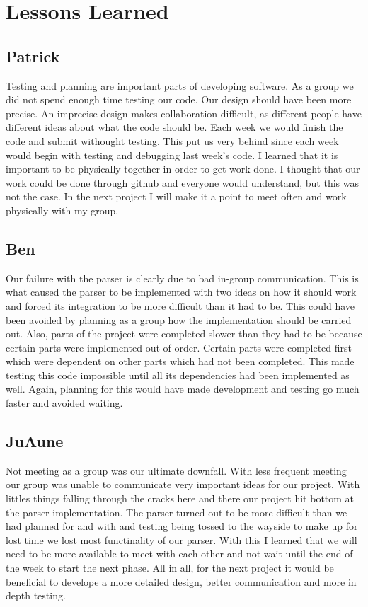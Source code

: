 \documentclass{article}
\begin{document}
\section{Lessons Learned}
\subsection{Patrick} Testing and planning are important parts of developing software. As a group we did not spend enough
time testing our code. Our design should have been more precise. An imprecise design makes collaboration
difficult, as different people have different ideas about what the code should be. Each week we would 
finish the code and submit withought testing. This put us very behind since each week would begin with testing
and debugging last week's code. I learned that it is important to be physically together in order to get work 
done. I thought that our work could be done through github and everyone would understand, but this was not the case.
In the next project I will make it a point to meet often and work physically with my group.

\subsection{Ben}Our failure with the parser is clearly due to bad in-group communication. This is what caused the
parser to be implemented with two ideas on how it should work and forced its integration to be more difficult than
it had to be. This could have been avoided by planning as a group how the implementation should be carried out. Also,
parts of the project were completed slower than they had to be because certain parts were implemented out of order.
Certain parts were completed first which were dependent on other parts which had not been completed. This made testing
this code impossible until all its dependencies had been implemented as well. Again, planning for this would have made
development and testing go much faster and avoided waiting. 


\subsection{JuAune} Not meeting as a group was our ultimate downfall. With less frequent meeting our group was unable to 
communicate very important ideas for our project. With littles things falling through the cracks here and there our 
project hit bottom at the parser implementation. The parser turned out to be more difficult than we had planned for and 
with and testing being tossed to the wayside to make up for lost time we lost most functinality of our parser. With this 
I learned that we will need to be more available to meet with each other and not wait until the end of the week to start 
the next phase. All in all, for the next project it would be beneficial to develope a more detailed design, better 
communication and more in depth testing.
\end{document}
